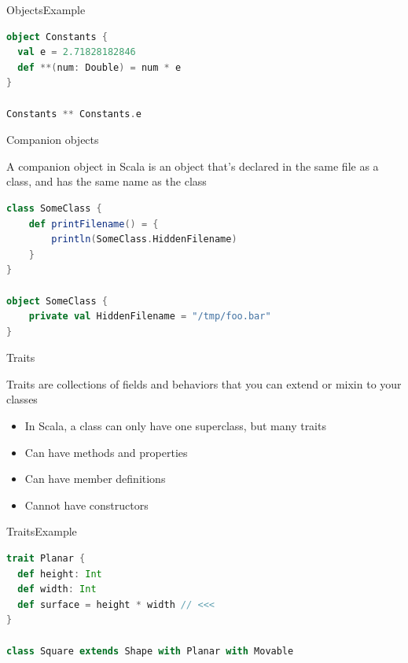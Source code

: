 \documentclass[aspectratio=169]{beamer}
\begin{document}
\begin{frame}[fragile]{Objects}{Example}
\begin{lstlisting}[style=scala,language=scala]
object Constants {
  val e = 2.71828182846
  def **(num: Double) = num * e
}

Constants ** Constants.e
\end{lstlisting}
\end{frame}

\begin{frame}[fragile]{Companion objects}
\begin{block}{}
  A companion object in Scala is an object that’s declared in the same file as a class, and has the
  same name as the class
\end{block}
 \vspace{1em}
\begin{lstlisting}[style=scala,language=scala]
class SomeClass {
    def printFilename() = {
        println(SomeClass.HiddenFilename)
    }
}

object SomeClass {
    private val HiddenFilename = "/tmp/foo.bar"
}
\end{lstlisting}
\end{frame}

\begin{frame}{Traits}
  \begin{block}{}
    Traits are collections of fields and behaviors that you can extend or mixin to your classes
  \end{block}
  \begin{itemize}
    \item In Scala, a class can only have one superclass, but many traits
    \item Can have methods and properties
    \item \alert{Can have} member definitions
    \item Cannot have constructors
  \end{itemize}
\end{frame}

\begin{frame}[fragile]{Traits}{Example}
\begin{lstlisting}[style=scala,language=scala]
trait Planar {
  def height: Int
  def width: Int
  def surface = height * width // <<<
}

class Square extends Shape with Planar with Movable
\end{lstlisting}
\end{frame}
\end{document}
